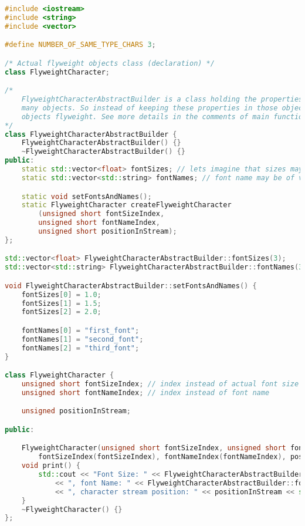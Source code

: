 \documentclass{book}
\begin{document}
\begin{lstlisting}[caption={Flyweight Pattern sample 2},language=C++]
#include <iostream>
#include <string>
#include <vector>

#define NUMBER_OF_SAME_TYPE_CHARS 3;

/* Actual flyweight objects class (declaration) */
class FlyweightCharacter;

/*
	FlyweightCharacterAbstractBuilder is a class holding the properties which are shared by
	many objects. So instead of keeping these properties in those objects we keep them externally, making
	objects flyweight. See more details in the comments of main function.
*/
class FlyweightCharacterAbstractBuilder {
	FlyweightCharacterAbstractBuilder() {}
	~FlyweightCharacterAbstractBuilder() {}
public:
	static std::vector<float> fontSizes; // lets imagine that sizes may be of floating point type
	static std::vector<std::string> fontNames; // font name may be of variable length (lets take 6 bytes is average)

	static void setFontsAndNames();
	static FlyweightCharacter createFlyweightCharacter
        (unsigned short fontSizeIndex,
		unsigned short fontNameIndex,
		unsigned short positionInStream);
};

std::vector<float> FlyweightCharacterAbstractBuilder::fontSizes(3);
std::vector<std::string> FlyweightCharacterAbstractBuilder::fontNames(3);

void FlyweightCharacterAbstractBuilder::setFontsAndNames() {
	fontSizes[0] = 1.0;
	fontSizes[1] = 1.5;
	fontSizes[2] = 2.0;

	fontNames[0] = "first_font";
	fontNames[1] = "second_font";
	fontNames[2] = "third_font";
}

class FlyweightCharacter {
	unsigned short fontSizeIndex; // index instead of actual font size
	unsigned short fontNameIndex; // index instead of font name

	unsigned positionInStream;

public:

	FlyweightCharacter(unsigned short fontSizeIndex, unsigned short fontNameIndex, unsigned short positionInStream):
		fontSizeIndex(fontSizeIndex), fontNameIndex(fontNameIndex), positionInStream(positionInStream) {}
	void print() {
		std::cout << "Font Size: " << FlyweightCharacterAbstractBuilder::fontSizes[fontSizeIndex]
			<< ", font Name: " << FlyweightCharacterAbstractBuilder::fontNames[fontNameIndex]
			<< ", character stream position: " << positionInStream << std::endl;
	}
	~FlyweightCharacter() {}
};


\end{lstlisting}
\end{document}
